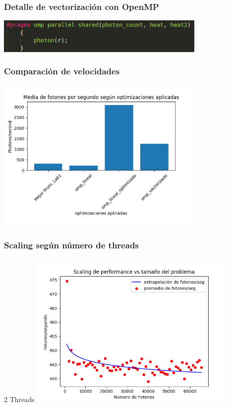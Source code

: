 \documentclass{beamer}
\begin{document}
    \begin{frame}
        \frametitle{Detalle de vectorización con OpenMP}
        \includegraphics[width=4in]{imagenes/omp_vec_9.png}

    \end{frame}

    \begin{frame}
        \frametitle{Comparación de velocidades}
        \includegraphics[width=4in]{imagenes/media_comp_3.png}
    \end{frame}

    \begin{frame}
        \frametitle{Scaling según número de threads}
        2 Threads
        \includegraphics[width=4in]{imagenes/scaling_2threads_alv.png}
    \end{frame}
\end{document}
